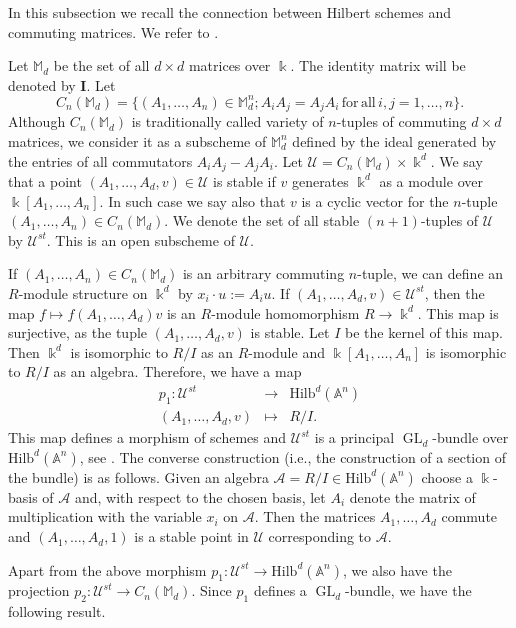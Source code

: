 \documentclass[11pt]{amsart}
\theoremstyle{definition}
\DeclareMathOperator{\GL}{GL}
\newcommand{\kk}{\Bbbk}
\newcommand{\A}{\mathbb{A}}
\newcommand{\Hilb}[2]{\mathrm{Hilb}^{#1}(\A^{#2})}
\newcommand{\ComMat}[2]{C_{#1}(\mathbb{M}_{#2})}
\newcommand{\cA}{\mathcal{A}}
\newcommand{\II}{\mathbf{I}}
\begin{document}
In this subsection we recall the connection between Hilbert schemes and commuting matrices. We refer to \cite{GKS, HJ, JS, Nak}.

Let $\mathbb{M}_d$ be the set of all $d\times d$ matrices over $\Bbbk$. The identity matrix will be denoted by $\II$. Let
$$\ComMat{n}{d}=\{(A_1,\ldots ,A_n)\in \mathbb{M}_d^n;A_iA_j=A_jA_i\, \mathrm{for}\, \mathrm{all}\, i,j=1,\ldots ,n\}.$$
Although $\ComMat{n}{d}$ is traditionally called variety of $n$-tuples of commuting $d\times d$ matrices, we consider it as a subscheme of $\mathbb{M}_d^n$ defined by the ideal generated by the entries of all commutators $A_iA_j-A_jA_i$. Let $\mathcal{U}=\ComMat{n}{d}\times \kk^d$. We say that a point $(A_1,\ldots ,A_d,v)\in \mathcal{U}$ is stable if $v$ generates $\kk^d$ as a module over $\kk[A_1,\ldots ,A_n]$. In such case we say also that $v$ is a cyclic vector for the $n$-tuple $(A_1,\ldots ,A_n)\in \ComMat{n}{d}$. We denote the set of all stable $(n+1)$-tuples of $\mathcal{U}$ by $\mathcal{U}^{st}$. This is an open subscheme of $\mathcal{U}$.

If $(A_1,\ldots ,A_n)\in \ComMat{n}{d}$ is an arbitrary commuting $n$-tuple, we can define an $R$-module structure on $\Bbbk^d$ by $x_i\cdot u:=A_iu$. If $(A_1,\ldots ,A_d,v)\in \mathcal{U}^{st}$, then the map $f\mapsto f(A_1,\ldots ,A_d)v$ is an $R$-module homomorphism $R\to \kk^d$. This map is surjective, as the tuple $(A_1,\ldots ,A_d,v)$ is stable. Let $I$ be the kernel of this map. Then $\kk^d$ is isomorphic to $R/I$ as an $R$-module and $\kk[A_1,\ldots ,A_n]$ is isomorphic to $R/I$ as an algebra. Therefore, we have a map
\begin{eqnarray*}
p_1\colon \mathcal{U}^{st}&\to&\Hilb{d}{n}\\
(A_1,\ldots ,A_d,v)&\mapsto&R/I.
\end{eqnarray*}
This map defines a morphism of schemes and $\mathcal{U}^{st}$ is a principal $\GL_d$-bundle over $\Hilb{d}{n}$, see \cite[Proposition 3.7]{JS}. The converse construction (i.e., the construction of a section of the bundle) is as follows. Given an algebra $\cA=R/I\in \Hilb{d}{n}$ choose a $\kk$-basis of $\cA$ and, with respect to the chosen basis, let $A_i$ denote the matrix of multiplication with the variable $x_i$ on $\cA$. Then the matrices $A_1,\ldots ,A_d$ commute and $(A_1,\ldots ,A_d,1)$ is a stable point in $\mathcal{U}$ corresponding to $\cA$.

Apart from the above morphism $p_1\colon \mathcal{U}^{st}\to \Hilb{d}{n}$, we also have the projection $p_2\colon \mathcal{U}^{st}\to \ComMat{n}{d}$. Since $p_1$ defines a $\GL_d$-bundle, we have the following result.
\end{document}
